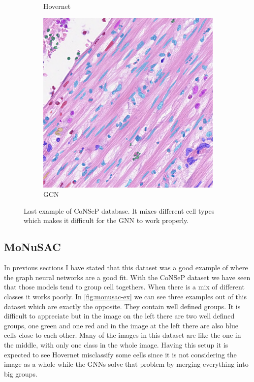 \begin{figure}[H]
\begin{subfigure}[b]{0.3\textwidth}
    \caption{Hovernet}
    \label{fig:consep-hov2}
  \end{subfigure}
  \begin{subfigure}[b]{0.3\textwidth}
    \includegraphics[width=\textwidth]{imgs/qual/consep/gcn-full3.png}
    \caption{GCN}
    \label{fig:consep-gcn2}
  \end{subfigure}
    \caption{Last example of CoNSeP database. It mixes different cell types which makes it difficult for the GNN to work properly.}
    \label{fig:consep-qual3}
\end{figure}

\newpage
\subsection{MoNuSAC}

In previous sections I have stated that this dataset was a good example of where the graph neural networks are a good fit. With the CoNSeP dataset we have seen that those models tend to group cell togethers. When there is a mix of different classes it works poorly. In \autoref{fig:monusac-ex} we can see three examples out of this dataset which are exactly the opposite. They contain well defined groups. It is difficult to appreciate but in the image on the left there are two well defined groups, one green and one red and in the image at the left there are also blue cells close to each other. Many of the images in this dataset are like the one in the middle, with only one class in the whole image. Having this setup it is expected to see Hovernet misclassify some cells since it is not considering the image as a whole while the GNNs solve that problem by merging everything into big groups.

